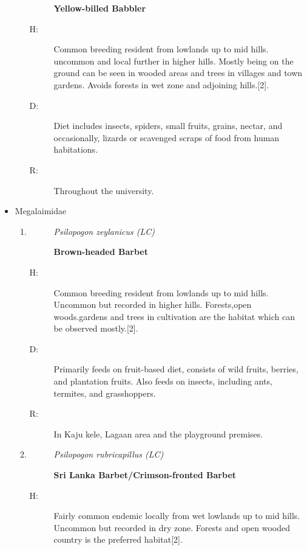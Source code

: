 \begin{itemize}
\begin{enumerate}
\begin{description}
\textbf{Yellow{-}billed Babbler}%
\end{description}%
\begin{description}%
\item[H: ]%
Common breeding resident from lowlands up to mid hills. uncommon and local further in higher hills. Mostly being on the ground can be seen in wooded areas and trees in villages and town gardens. Avoids forests in wet zone and adjoining hills.{[}2{]}.%
\item[D: ]%
Diet includes insects, spiders, small fruits, grains, nectar, and occasionally, lizards or scavenged scraps of food from human habitations.%
\item[R: ]%
Throughout the university.%
\end{description}%
\end{enumerate}%
\item%
Megalaimidae%
\begin{enumerate}%
\item%
\begin{description}%
\item[]%
\textit{Psilopogon zeylanicus (LC)}%
\item[]%
\textbf{Brown{-}headed Barbet}%
\end{description}%
\begin{description}%
\item[H: ]%
Common breeding resident from lowlands up to mid hills. Uncommon but recorded in higher hills. Forests,open woods.gardens and trees in cultivation are the habitat which can be observed mostly.{[}2{]}.%
\item[D: ]%
Primarily feeds on fruit{-}based diet, consists of wild fruits, berries, and plantation fruits. Also feeds on insects, including ants, termites, and grasshoppers.%
\item[R: ]%
In Kaju kele, Lagaan area and the playground premises.%
\end{description}%
\item%
\begin{description}%
\item[]%
\textit{Psilopogon rubricapillus (LC)}%
\item[]%
\textbf{Sri Lanka Barbet/Crimson{-}fronted Barbet}%
\end{description}%
\begin{description}%
\item[H: ]%
Fairly common endemic locally from wet lowlands up to mid hills. Uncommon but recorded in dry zone. Forests and open wooded country is the preferred habitat{[}2{]}.%

\end{description}
\end{enumerate}
\end{itemize}
